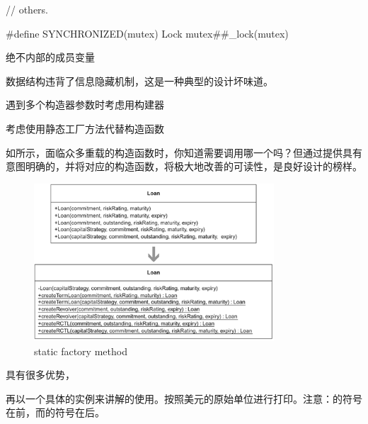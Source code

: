 \begin{content}
\begin{leftbar}
\begin{c++}
{    // others.
}

#define SYNCHRONIZED(mutex) Lock mutex##_lock(mutex)
\end{c++}
\end{leftbar}

\begin{regulation}
绝不内部的成员变量
\end{regulation}

数据结构违背了信息隐藏机制，这是一种典型的设计坏味道。

\begin{regulation}
遇到多个构造器参数时考虑用构建器
\end{regulation}

\begin{regulation}
考虑使用静态工厂方法代替构造函数
\end{regulation}

如所示，面临众多重载的构造函数时，你知道需要调用哪一个吗？但通过提供具有意图明确的，并将对应的构造函数，将极大地改善的可读性，是良好设计的榜样。

\begin{figure}[H]
  \centering
  \includegraphics[width=0.8\textwidth]{figures/static-factory}
  \caption{static factory method}
  \label{fig:static-factory}
\end{figure}

具有很多优势，
\begin{enum}
\end{enum}

再以一个具体的实例来讲解的使用。按照美元的原始单位进行打印。注意：的符号在前，而的符号在后。
\begin{enum}
\end{enum}


\end{content}
